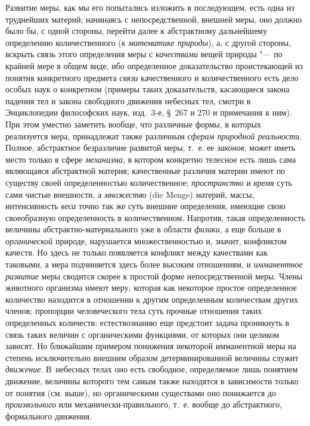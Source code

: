 Развитие меры, как мы его попытались изложить в последующем, есть одна из
труднейших материй; начинаясь с непосредственной, внешней меры, оно должно
было бы, с одной стороны, перейти далее к абстрактному дальнейшему
определению количественного ({\em к математике
природы}), а, с другой стороны, вскрыть связь этого определения меры с
{\em качествами} вещей природы "--- по крайней мере в
общем виде, ибо определенное доказательство проистекающей из понятия
конкретного предмета {\em связи} качественного и
количественного есть дело особых наук о конкретном (примеры таких
доказательств, касающиеся закона падения тел и закона свободного движения
небесных тел, смотри в Энциклопедии философских наук, изд.~3-е, \S~267 и 270
и примечания к ним). При этом уместно заметить вообще, что различные формы,
в которых реализуется мера, принадлежат также различным
{\em сферам природной реальности}. Полное, абстрактное
безразличие развитой меры, т.~е. ее {\em законов},
может иметь место только в сфере {\em механизма}, в
котором конкретно телесное есть лишь сама являющаяся абстрактной материя;
качественные различия материи имеют по существу своей определенностью
количественное; {\em пространство} и
{\em время} суть сами чистые внешности, а
{\em множество} (die Menge) материй, массы,
интенсивность {\em веса} точно так же суть внешние
определения, имеющие свою своеобразную определенность в количественном.
Напротив, такая определенность величины абстрактно-материального уже в
области {\em физики}, а еще больше в
{\em органической} природе, нарушается множественностью
и, значит, конфликтом качеств. Но здесь не только появляется конфликт между
качествами как таковыми, а мера подчиняется здесь более высоким отношениям,
и {\em имманентное развитие} меры сводится скорее к
простой форме непосредственной меры. Члены животного организма имеют меру,
которая как некоторое простое определенное количество находится в отношении
к другим определенным количествам других членов; пропорции человеческого
тела суть прочные отношения таких определенных количеств; естествознанию
еще предстоит задача проникнуть в связь таких величин с органическими
функциями, от которых они целиком зависят. Но ближайшим примером понижения
некоторой имманентной меры на степень исключительно внешним образом
детерминированной величины служит {\em движение}.
В~небесных телах оно есть свободное, определяемое лишь понятием движение,
величины которого тем самым также находятся в зависимости только от понятия
(см. выше), но органическими существами оно понижается до
{\em произвольного} или механически-правильного, т.~е.
вообще до абстрактного, формального движения.

